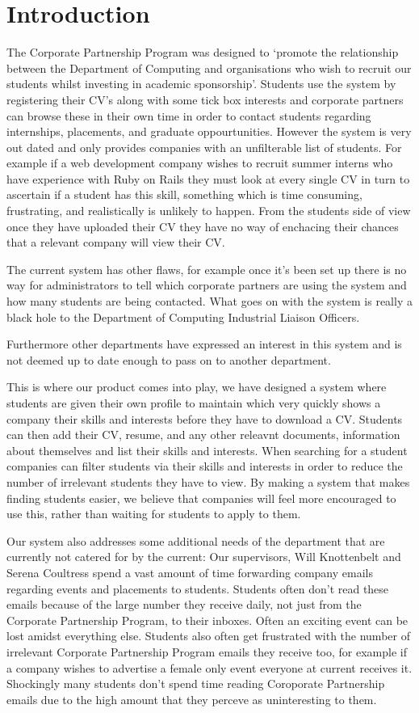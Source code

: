 \section{Introduction}
The Corporate Partnership Program was designed to `promote the relationship between the Department of Computing and organisations who wish to recruit our students whilst investing in academic sponsorship'.\cite{doc-cpp}
Students use the system by registering their CV's along with some tick box interests and corporate partners can browse these in their own time in order to contact students regarding internships, placements, and graduate oppourtunities.
However the system is very out dated and only provides companies with an unfilterable list of students. For example if a web development company wishes to recruit summer interns who have experience with Ruby on Rails they must look at every single CV in turn to ascertain if a student has this skill, something which is time consuming, frustrating, and realistically is unlikely to happen.
From the students side of view once they have uploaded their CV they have no way of enchacing their chances that a relevant company will view their CV.

The current system has other flaws, for example once it's been set up there is no way for administrators to tell which corporate partners are using the system and how many students are being contacted. What goes on with the system is really a black hole to the Department of Computing Industrial Liaison Officers. 

Furthermore other departments have expressed an interest in this system and is not deemed up to date enough to pass on to another department.

This is where our product comes into play, we have designed a system where students are given their own profile to maintain which very quickly shows a company their skills and interests before they have to download a CV. Students can then add their CV, resume, and any other releavnt documents, information about themselves and list their skills and interests.
When searching for a student companies can filter students via their skills and interests in order to reduce the number of irrelevant students they have to view. By making a system that makes finding students easier, we believe that companies will feel more encouraged to use this, rather than waiting 
for students to apply to them.

Our system also addresses some additional needs of the department that are currently not catered for by the current:
Our supervisors, Will Knottenbelt and Serena Coultress spend a vast amount of time forwarding company emails regarding events and placements to students.
Students often don't read these emails because of the large number they receive daily, not just from the Corporate Partnership Program, to their inboxes. Often an exciting event can be lost amidst everything else. Students also often get frustrated with the number of irrelevant Corporate Partnership Program emails they receive too, for example if a company wishes to advertise a female only event everyone at current receives it.
Shockingly many students don't spend time reading Coroporate Partnership emails due to the high amount that they perceve as uninteresting to them.

